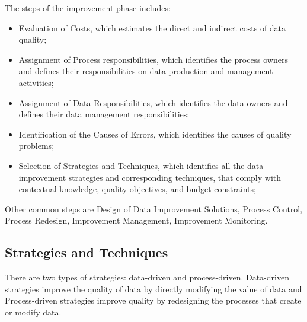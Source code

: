 \documentclass[pdftex,english,oribibl]{llncs}
\begin{document}
The steps of the improvement phase includes:
\begin{itemize}
    \item Evaluation of Costs, which estimates the direct and indirect costs of data quality;
    \item Assignment of Process responsibilities, which identifies the process owners and defines their responsibilities on data production and management activities;
    \item Assignment of Data Responsibilities, which identifies the data owners and defines their data management responsibilities;
    \item Identification of the Causes of Errors, which identifies the causes of quality problems;
    \item Selection of Strategies and Techniques, which identifies all the data improvement strategies and corresponding techniques, that comply with contextual knowledge, quality objectives, and budget constraints;
\end{itemize}
    Other common steps are Design of Data Improvement Solutions, Process Control,  Process Redesign, Improvement Management, Improvement Monitoring.
\begin{comment}
    \item Design of Data Improvement Solutions, which selects the most effective and efficient strategy and related set of techniques and tools to improve data quality;
    \item  Process Control, which defines check points in the data production processes, to monitor quality during process execution;
    \item Process Redesign, which defines the process improvement actions that can deliver corresponding DQ improvements;
    \item Improvement Management, which defines new organizational rules for data quality;
    \item Improvement Monitoring, which establishes periodic monitoring activities that provide feedback on the results of the improvement process and enables its dynamic tuning.
\end{comment}

\subsection{Strategies and Techniques}
There are two types of strategies: data-driven and process-driven. Data-driven strategies improve the quality of data by directly modifying the value of data and Process-driven strategies improve quality by redesigning the processes that create or modify data.
\end{document}
